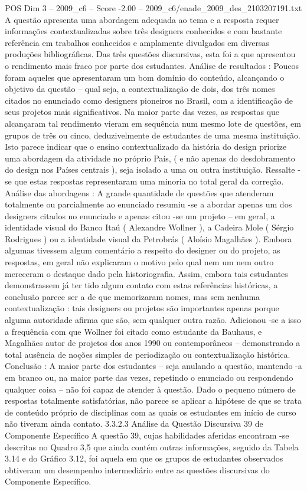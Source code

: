 \begin{textsample}{POS Dim 3 – 2009\_c6 – Score -2.00 – 2009\_c6/enade\_2009\_des\_2103207191.txt}
A questão apresenta uma abordagem adequada ao tema e a resposta requer informações contextualizadas sobre três designers conhecidos e com bastante referência em trabalhos conhecidos e amplamente divulgados em diversas produções bibliográficas.
Das três questões discursivas, esta foi a que apresentou o rendimento mais fraco por parte dos estudantes.
Análise de resultados : Poucos foram aqueles que apresentaram um bom domínio do conteúdo, alcançando o objetivo da questão – qual seja, a contextualização de dois, dos três nomes citados no enunciado como designers pioneiros no Brasil, com a identificação de seus projetos mais significativos.
Na maior parte das vezes, as respostas que alcançaram tal rendimento vieram em sequência num mesmo lote de questões, em grupos de três ou cinco, deduzivelmente de estudantes de uma mesma instituição.
Isto parece indicar que o ensino contextualizado da história do design priorize uma abordagem da atividade no próprio País, ( e não apenas do desdobramento do design nos Países centrais ), seja isolado a uma ou outra instituição.
Ressalte -se que estas respostas representaram uma minoria no total geral da correção.
Análise das abordagens : A grande quantidade de questões que atenderam totalmente ou parcialmente ao enunciado resumiu -se a abordar apenas um dos designers citados no enunciado e apenas citou -se um projeto – em geral, a identidade visual do Banco Itaú ( Alexandre Wollner ), a Cadeira Mole ( Sérgio Rodrigues ) ou a identidade visual da Petrobrás ( Aloísio Magalhães ).
Embora algumas tivessem algum comentário a respeito do designer ou do projeto, as respostas, em geral não explicaram o motivo pelo qual nem um nem outro mereceram o destaque dado pela historiografia.
Assim, embora tais estudantes demonstrassem já ter tido algum contato com estas referências históricas, a conclusão parece ser a de que memorizaram nomes, mas sem nenhuma contextualização : tais designers ou projetos são importantes apenas porque alguma autoridade afirma que são, sem qualquer outra razão.
Adicionou -se a isso a frequência com que Wollner foi citado como estudante da Bauhaus, e Magalhães autor de projetos dos anos 1990 ou contemporâneos – demonstrando a total ausência de noções simples de periodização ou contextualização histórica.
Conclusão : A maior parte dos estudantes – seja anulando a questão, mantendo -a em branco ou, na maior parte das vezes, repetindo o enunciado ou respondendo qualquer coisa – não foi capaz de atender à questão.
Dado o pequeno número de respostas totalmente satisfatórias, não parece se aplicar a hipótese de que se trata de conteúdo próprio de disciplinas com as quais os estudantes em início de curso não tiveram ainda contato. 3.3.2.3 Análise da Questão Discursiva 39 de Componente Específico A questão 39, cujas habilidades aferidas encontram -se descritas no Quadro 3,5 que ainda contém outras informações, seguido da Tabela 3.14 e do Gráfico 3.12, foi aquela em que os grupos de estudantes observados obtiveram um desempenho intermediário entre as questões discursivas do Componente Específico.

\end{textsample}
